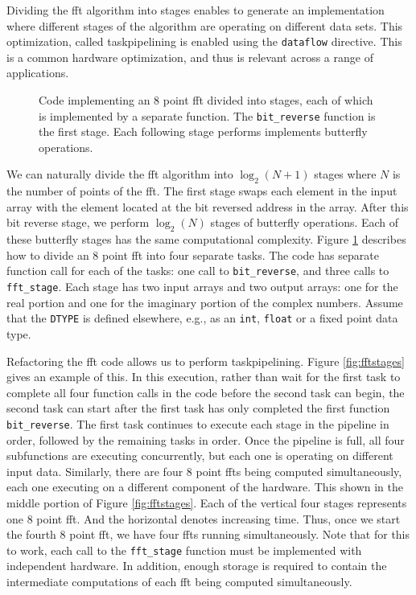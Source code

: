 Dividing the \gls{fft} algorithm into stages enables \VHLS to generate an implementation where different stages of the algorithm are operating on different data sets. This optimization, called \gls{taskpipelining} is enabled using the \lstinline{dataflow} directive. This is a common hardware optimization, and thus is relevant across a range of applications.

\begin{figure}
\begin{tiny}

\end{tiny}
\caption{Code implementing an 8 point \gls{fft} divided into stages, each of which is implemented by a separate function. The \lstinline{bit_reverse} function is the first stage. Each following stage performs implements butterfly operations. }
\label{fig:fft_stages_code}
\end{figure}

We can naturally divide the \gls{fft} algorithm into $\log_2(N+1)$ stages where $N$ is the number of points of the \gls{fft}.  The first stage swaps each element in the input array with the element located at the bit reversed address in the array. After this bit reverse stage, we perform $\log_2(N)$ stages of butterfly operations. Each of these butterfly stages has the same computational complexity.  Figure \ref{fig:fft_stages_code} describes how to divide an 8 point \gls{fft} into four separate tasks. The code has separate function call for each of the tasks: one call to \lstinline{bit_reverse}, and three calls to \lstinline{fft_stage}. Each stage has two input arrays and two output arrays: one for the real portion and one for the imaginary portion of the complex numbers. Assume that the \lstinline{DTYPE} is defined elsewhere, e.g., as an \lstinline{int}, \lstinline{float} or a fixed point data type.

Refactoring the \gls{fft} code allows us to perform \gls{taskpipelining}. Figure \ref{fig:fftstages} gives an example of this. In this execution, rather than wait for the first task to complete all four function calls in the code before the second task can begin, the second task can start after the first task has only completed the first function \lstinline{bit_reverse}. The first task continues to execute each stage in the pipeline in order, followed by the remaining tasks in order.  Once the pipeline is full, all four subfunctions are executing concurrently, but each one is operating on different input data. Similarly, there are four 8 point \glspl{fft} being computed simultaneously, each one executing on a different component of the hardware. This shown in the middle portion of Figure \ref{fig:fftstages}. Each of the vertical four stages represents one 8 point \gls{fft}. And the horizontal denotes increasing time. Thus, once we start the fourth 8 point \gls{fft}, we have four \glspl{fft} running simultaneously.  Note that for this to work, each call to the \lstinline{fft_stage} function must be implemented with independent hardware.  In addition, enough storage is required to contain the intermediate computations of each \gls{fft} being computed simultaneously.

